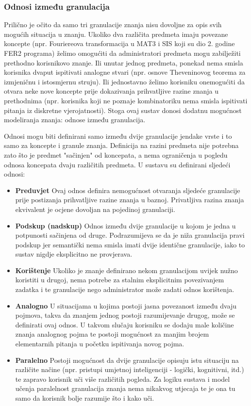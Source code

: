 \documentclass[times, utf8, zavrsni]{fer}
\begin{document}
\subsubsection{Odnosi između granulacija}
Prilično je očito da samo tri granulacije znanja nisu dovoljne za opis svih mogućih situacija u znanju. Ukoliko dva različita predmeta imaju povezane koncepte (npr. Fouriereova transformacija u MAT3 i SIS koji su dio 2. godine FER2 programa) želimo omogućiti da administratori predmeta mogu zabilježiti prethodno korisnikovo znanje. Ili unutar jednog predmeta, ponekad nema smisla korisnika dvaput ispitivati analogne stvari (npr. osnove Theveninovog teorema za izmjeničnu i istosmjernu struju). Ili jednostavno želimo korisniku onemogućiti da otvara neke nove koncepte prije dokazivanja prihvatljive razine znanja u prethodnima (npr. korisnika koji ne poznaje kombinatoriku nema smisla ispitivati pitanja iz diskretne vjerojatnosti). Stoga ovaj sustav donosi dodatnu mogućnost modeliranja znanja: odnose između granulacija.
\par
Odnosi mogu biti definirani samo između dvije granulacije jendake vrste i to samo za koncepte i granule znanja. Definicija na razini predmeta nije potrebna zato što je predmet "sačinjen" od koncepata, a nema ograničenja u pogledu odnosa koncepata dvaju različitih predmeta. U sustavu su definirani sljedeći odnosi:

\begin{itemize}
\item \textbf{Preduvjet} Ovaj odnos definira nemogućnost otvaranja sljedeće granulacije prije postizanja prihvatljive razine znanja u baznoj. Privatljiva razina znanja ekvivalent je ocjene dovoljan na pojedinoj granulaciji.

\item \textbf{Podskup (nadskup)} Odnos između dvije granulacije u kojom je jedna u potpunosti sačinjena od druge. Podrazumijeva se da je niža granulacija pravi podskup jer semantički nema smisla imati dvije identične granulacije, iako to sustav nigdje eksplicitno ne provjerava.
\item \textbf{Korištenje} Ukoliko je znanje definirano nekom granulacijom uvijek nužno koristiti u drugoj, nema potrebe za stalnim eksplicitnim povezivanjem zadatka i te granulacije nego administrator može zadati odnos korištenja.
\item \textbf{Analogno} U situacijama u kojima postoji jasna povezanost između dvaju pojmova, takva da znanjem jednog postoji razumijevanje drugog, može se definirati ovaj odnos. U takvom slučaju korisniku se dodaju male količine znanja analognog pojma te postoji mogućnost za manjim brojem elementarnih pitanja u početku ispitivanja novog pojma.
\item \textbf{Paralelno} Postoji mogućnost da dvije granulacije opisuju istu situaciju na različite načine (npr. pristupi umjetnoj inteligenciji - logički, kognitivni, itd.) te zapravo korisnik uči više različitih pogleda. Za logiku sustava i model učenja paralelnost granulacija znanja nema nikakvog utjecaja te je ona tu samo da korisnik bolje razumije što i kako uči. 
\end{itemize}
\end{document}
